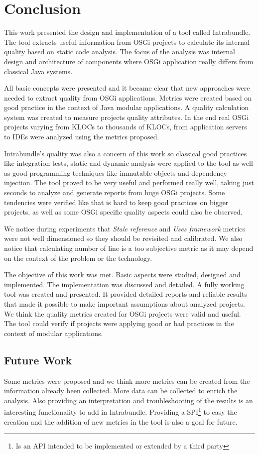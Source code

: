 \chapter{Conclusion}
This work presented the design and implementation of a tool called Intrabundle. The tool extracts useful information from OSGi projects to calculate its internal quality based on static code analysis. The focus of the analysis was internal design and architecture of components where OSGi application really differs from classical Java systems. 

All basic concepts were presented and it became clear that new approaches were needed to extract quality from OSGi applications. Metrics were created based on good practice in the context of Java modular applications. A quality calculation system was created to measure projects quality attributes. In the end real OSGi projects varying from KLOCs to thousands of KLOCs, from application servers to IDEs were analyzed using the metrics proposed.

Intrabundle's quality was also a concern of this work so classical good practices like integration tests, static and dynamic analysis were applied to the tool as well as good programming techniques like immutable objects and dependency injection.      
The tool proved to be very useful and performed really well, taking just seconds to analyze and generate reports from huge OSGi projects. Some tendencies were verified like that is hard to keep good practices on bigger projects, as well as some OSGi specific quality aspects could also be observed. 

We notice during experiments that \emph{Stale reference} and \emph{Uses framework} metrics were not well dimensioned so they should be revisited and calibrated. We also notice that calculating number of line is a too subjective metric as it may depend on the context of the problem or the technology.

The objective of this work was met. Basic aspects were studied, designed and implemented. The implementation was discussed and detailed. A fully working tool was created and presented. It provided detailed reports and reliable results that made it possible to make important assumptions about analyzed projects. We think the quality metrics created for OSGi projects were valid and useful. The tool could verify if projects were applying good or bad practices in the context of modular applications. 

\section{Future Work}
Some metrics were proposed and we think more metrics can be created from the information already been collected. More data can be collected to enrich the analysis. Also providing an interpretation and troubleshooting of the results is an interesting functionality to add in Intrabundle. Providing a SPI\footnote{Is an API intended to be implemented or extended by a third party} to easy the creation and the addition of new metrics in the tool is also a goal for future.


